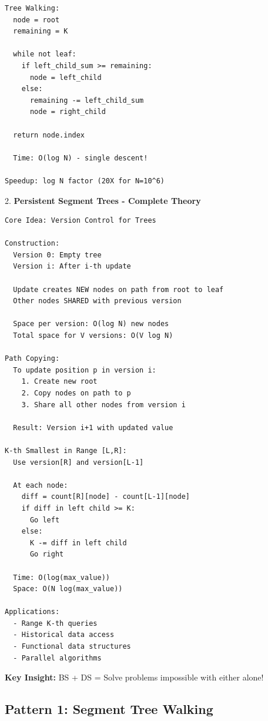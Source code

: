 \documentclass[11pt,a4paper,oneside]{book}
\begin{document}
\begin{tcolorbox}[
    enhanced,breakable,
    colback=white,
    colframe=deepblue,
    boxrule=1.5pt,
    arc=3mm,
    title=\textbf{The Ultimate Optimization Paradigm}
]
\begin{verbatim}
Tree Walking:
  node = root
  remaining = K
  
  while not leaf:
    if left_child_sum >= remaining:
      node = left_child
    else:
      remaining -= left_child_sum
      node = right_child
  
  return node.index
  
  Time: O(log N) - single descent!

Speedup: log N factor (20X for N=10^6)
\end{verbatim}

2. \textbf{Persistent Segment Trees - Complete Theory}
\begin{verbatim}
Core Idea: Version Control for Trees

Construction:
  Version 0: Empty tree
  Version i: After i-th update
  
  Update creates NEW nodes on path from root to leaf
  Other nodes SHARED with previous version
  
  Space per version: O(log N) new nodes
  Total space for V versions: O(V log N)

Path Copying:
  To update position p in version i:
    1. Create new root
    2. Copy nodes on path to p
    3. Share all other nodes from version i
  
  Result: Version i+1 with updated value

K-th Smallest in Range [L,R]:
  Use version[R] and version[L-1]
  
  At each node:
    diff = count[R][node] - count[L-1][node]
    if diff in left child >= K:
      Go left
    else:
      K -= diff in left child
      Go right
  
  Time: O(log(max_value))
  Space: O(N log(max_value))

Applications:
  - Range K-th queries
  - Historical data access
  - Functional data structures
  - Parallel algorithms
\end{verbatim}

\textbf{Key Insight:}
BS + DS = Solve problems impossible with either alone!
\end{tcolorbox}

\subsection{Pattern 1: Segment Tree Walking}
\end{document}
